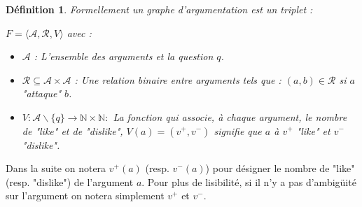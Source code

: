 \documentclass[11pt]{article}
\theoremstyle{defi}
\newtheorem{definition}{Définition}[section]
\theoremstyle{not}
\theoremstyle{prob}
\begin{document}
    \begin{definition}
      Formellement un graphe d'argumentation est un triplet :

      $F = \langle \mathcal{A}, \mathcal{R}, V \rangle$ avec :
      \begin{itemize}
        \item $\mathcal{A}$ : L'ensemble des arguments et la question $q$.
        \item $\mathcal{R} \subseteq \mathcal{A} \times \mathcal{A}$ : Une relation binaire entre arguments tels que : $(a,b) \in \mathcal{R}$ si $a$ "attaque" $b$.
        \item $V: \mathcal{A}\backslash \{q\} \rightarrow \mathbb{N} \times \mathbb{N} :$ La fonction qui associe, à chaque argument, le nombre de "like" et de "dislike", $V(a) = (v^+, v^-)$ signifie que $a$ à $v^+$ "like" et $v^-$ "dislike".
      \end{itemize}
    \end{definition}

    Dans la suite on notera $v^+(a)$ (resp. $v^-(a)$) pour désigner le nombre de "like" (resp. "dislike") de l'argument $a$. Pour plus de lisibilité, si il n'y a pas d'ambigüité sur l'argument on notera simplement $v^+$ et $v^-$.
\end{document}
